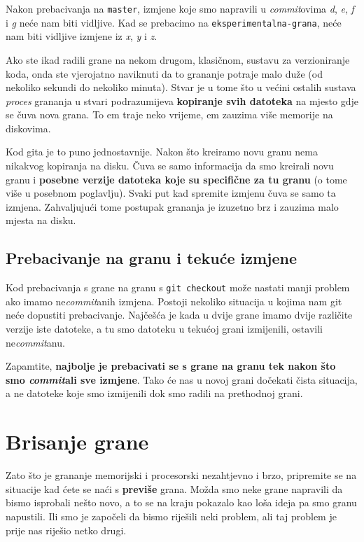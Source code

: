 Nakon prebacivanja na \verb+master+, izmjene koje smo napravili u \emph{commit}ovima \emph d, \emph e, \emph f i \emph g neće nam biti vidljive.
Kad se prebacimo na \verb+eksperimentalna-grana+, neće nam biti vidljive izmjene iz \emph x, \emph y i \emph z.

Ako ste ikad radili grane na nekom drugom, klasičnom, sustavu za verzioniranje koda, onda ste vjerojatno naviknuti da to grananje potraje malo duže (od nekoliko sekundi do nekoliko minuta).
Stvar je u tome što u većini ostalih sustava \emph{proces} grananja u stvari podrazumijeva \textbf{kopiranje svih datoteka} na mjesto gdje se čuva nova grana.
To em traje neko vrijeme, em zauzima više memorije na diskovima.

Kod gita je to puno jednostavnije. Nakon što kreiramo novu granu nema nikakvog kopiranja na disku. 
Čuva se samo informacija da smo kreirali novu granu i \textbf{posebne verzije datoteka koje su specifične za tu granu} (o tome više u posebnom poglavlju).
Svaki put kad spremite izmjenu čuva se samo ta izmjena.
Zahvaljujući tome postupak grananja je izuzetno brz i zauzima malo mjesta na disku.

\subsection*{Prebacivanje na granu i tekuće izmjene}

Kod prebacivanja s grane na granu s \verb+git checkout+ može nastati manji problem ako imamo ne\emph{commit}anih izmjena.
Postoji nekoliko situacija u kojima nam git neće dopustiti prebacivanje.
Najčešća je kada u dvije grane imamo dvije različite verzije iste datoteke, a tu smo datoteku u tekućoj grani izmijenili, ostavili ne\emph{commit}anu.

Zapamtite, \textbf{najbolje je prebacivati se s grane na granu tek nakon što smo \emph{commit}ali sve izmjene}. Tako će nas u novoj grani dočekati čista situacija, a ne datoteke koje smo izmijenili dok smo radili na prethodnoj grani. 

\section*{Brisanje grane}

Zato što je grananje memorijski i procesorski nezahtjevno i brzo, pripremite se na situacije kad ćete se naći s \textbf{previše} grana.
Možda smo neke grane napravili da bismo isprobali nešto novo, a to se na kraju pokazalo kao loša ideja pa smo granu napustili.
Ili smo je započeli da bismo riješili neki problem, ali taj problem je prije nas riješio netko drugi.

